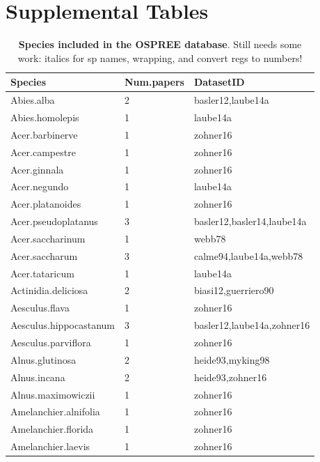 \documentclass{article}
\begin{document}


\newpage
\section* {Supplemental Tables}
\begin{footnotesize} 
\begingroup\footnotesize
\begin{longtable}{|p{}|p{}|p{}|}
\caption{\textbf{Species included in the OSPREE database}. Still needs some work: italics for sp names, wrapping, and convert regs to numbers!
} \\ 
  \hline
Species & Num.papers & DatasetID \\ 
  \hline
Abies.alba &   2 & basler12,laube14a \\ 
  Abies.homolepis &   1 & laube14a \\ 
  Acer.barbinerve &   1 & zohner16 \\ 
  Acer.campestre &   1 & zohner16 \\ 
  Acer.ginnala &   1 & zohner16 \\ 
  Acer.negundo &   1 & laube14a \\ 
  Acer.platanoides &   1 & zohner16 \\ 
  Acer.pseudoplatanus &   3 & basler12,basler14,laube14a \\ 
  Acer.saccharinum &   1 & webb78 \\ 
  Acer.saccharum &   3 & calme94,laube14a,webb78 \\ 
  Acer.tataricum &   1 & laube14a \\ 
  Actinidia.deliciosa &   2 & biasi12,guerriero90 \\ 
  Aesculus.flava &   1 & zohner16 \\ 
  Aesculus.hippocastanum &   3 & basler12,laube14a,zohner16 \\ 
  Aesculus.parviflora &   1 & zohner16 \\ 
  Alnus.glutinosa &   2 & heide93,myking98 \\ 
  Alnus.incana &   2 & heide93,zohner16 \\ 
  Alnus.maximowiczii &   1 & zohner16 \\ 
  Amelanchier.alnifolia &   1 & zohner16 \\ 
  Amelanchier.florida &   1 & zohner16 \\ 
  Amelanchier.laevis &   1 & zohner16 \\ 

\end{longtable}
\end{footnotesize}
\end{document}
